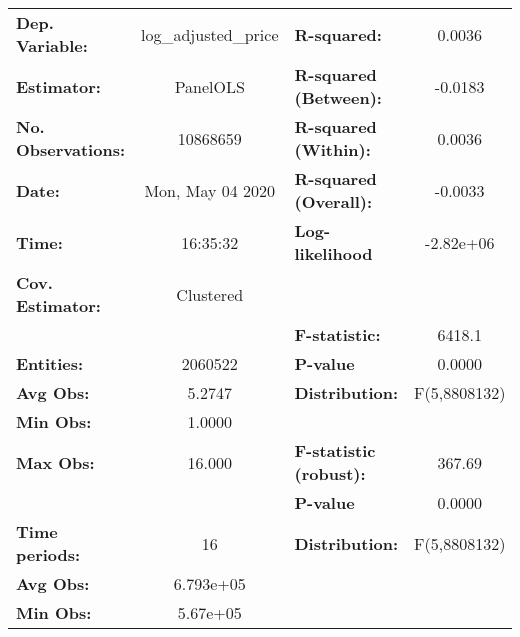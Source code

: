 \documentclass{report}
\begin{document}
\begin{center}
\begin{tabular}{lclc}
\toprule
\textbf{Dep. Variable:}                          & log\_adjusted\_price & \textbf{  R-squared:         }   &      0.0036      \\
\textbf{Estimator:}                              &       PanelOLS       & \textbf{  R-squared (Between):}  &     -0.0183      \\
\textbf{No. Observations:}                       &       10868659       & \textbf{  R-squared (Within):}   &      0.0036      \\
\textbf{Date:}                                   &   Mon, May 04 2020   & \textbf{  R-squared (Overall):}  &     -0.0033      \\
\textbf{Time:}                                   &       16:35:32       & \textbf{  Log-likelihood     }   &    -2.82e+06     \\
\textbf{Cov. Estimator:}                         &      Clustered       & \textbf{                     }   &                  \\
\textbf{}                                        &                      & \textbf{  F-statistic:       }   &      6418.1      \\
\textbf{Entities:}                               &       2060522        & \textbf{  P-value            }   &      0.0000      \\
\textbf{Avg Obs:}                                &        5.2747        & \textbf{  Distribution:      }   &   F(5,8808132)   \\
\textbf{Min Obs:}                                &        1.0000        & \textbf{                     }   &                  \\
\textbf{Max Obs:}                                &        16.000        & \textbf{  F-statistic (robust):} &      367.69      \\
\textbf{}                                        &                      & \textbf{  P-value            }   &      0.0000      \\
\textbf{Time periods:}                           &          16          & \textbf{  Distribution:      }   &   F(5,8808132)   \\
\textbf{Avg Obs:}                                &      6.793e+05       & \textbf{                     }   &                  \\
\textbf{Min Obs:}                                &       5.67e+05       & \textbf{                     }   &                  \\

\end{tabular}
\end{center}
\end{document}
